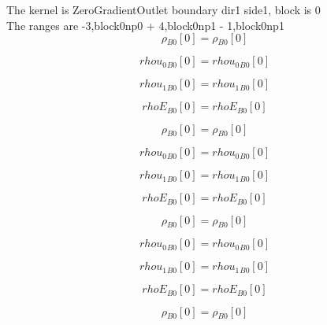 \documentclass{article}
\begin{document}
\noindent The kernel is ZeroGradientOutlet boundary dir1 side1, block is 0\\\noindent The ranges are -3,block0np0 + 4,block0np1 - 1,block0np1\\\begin{dmath}{\rho{_{B0}}}[{0}] = {\rho{_{B0}}}[{0}]\end{dmath}

\begin{dmath}{rhou_{0}{_{B0}}}[{0}] = {rhou_{0}{_{B0}}}[{0}]\end{dmath}

\begin{dmath}{rhou_{1}{_{B0}}}[{0}] = {rhou_{1}{_{B0}}}[{0}]\end{dmath}

\begin{dmath}{rhoE{_{B0}}}[{0}] = {rhoE{_{B0}}}[{0}]\end{dmath}

\begin{dmath}{\rho{_{B0}}}[{0}] = {\rho{_{B0}}}[{0}]\end{dmath}

\begin{dmath}{rhou_{0}{_{B0}}}[{0}] = {rhou_{0}{_{B0}}}[{0}]\end{dmath}

\begin{dmath}{rhou_{1}{_{B0}}}[{0}] = {rhou_{1}{_{B0}}}[{0}]\end{dmath}

\begin{dmath}{rhoE{_{B0}}}[{0}] = {rhoE{_{B0}}}[{0}]\end{dmath}

\begin{dmath}{\rho{_{B0}}}[{0}] = {\rho{_{B0}}}[{0}]\end{dmath}

\begin{dmath}{rhou_{0}{_{B0}}}[{0}] = {rhou_{0}{_{B0}}}[{0}]\end{dmath}

\begin{dmath}{rhou_{1}{_{B0}}}[{0}] = {rhou_{1}{_{B0}}}[{0}]\end{dmath}

\begin{dmath}{rhoE{_{B0}}}[{0}] = {rhoE{_{B0}}}[{0}]\end{dmath}

\begin{dmath}{\rho{_{B0}}}[{0}] = {\rho{_{B0}}}[{0}]\end{dmath}
\end{document}

